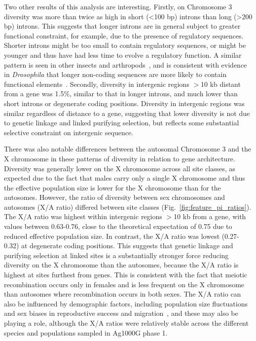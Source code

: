 \documentclass[a4paper,11pt,abstracton,hidelinks]{scrartcl}
\begin{document}
Two other results of this analysis are interesting.
%
Firstly, on Chromosome 3 diversity was more than twice as high in short (<100 bp) introns than long (>200 bp) introns.
%
This suggests that longer introns are in general subject to greater functional constraint, for example, due to the presence of regulatory sequences.
%
Shorter introns might be too small to contain regulatory sequences, or might be younger and thus have had less time to evolve a regulatory function.
%
A similar pattern is seen in other insects and arthropods~\parencite{Singh2013,Martin2016,Lynch2016}, and is consistent with evidence in
\textit{Drosophila} that longer non-coding sequences are more likely to contain functional elements~\parencite{Casillas2007}.
%
Secondly, diversity in intergenic regions $>$10 kb distant from a gene was 1.5\%, similar to that in longer introns, and much lower than short introns or degenerate coding positions.
%
Diversity in intergenic regions was similar regardless of distance to a gene, suggesting that lower diversity is not due to genetic linkage and linked purifying selection, but reflects some substantial selective constraint on intergenic sequence.


There was also notable differences between the autosomal Chromosome 3 and the X chromosome in these patterns of diversity in relation to gene architecture.
%
Diversity was generally lower on the X chromosome across all site classes, as expected due to the fact that males carry only a single X chromosome and thus the effective population size is lower for the X chromosome than for the autosomes.
%
However, the ratio of diversity between sex chromosomes and autosomes (X/A ratio) differed between site classes (Fig.~\ref{fig:feature_pi_ratios}).
%
The X/A ratio was highest within intergenic regions $>$10 kb from a gene, with values between 0.63-0.76, close to the theoretical expectation of 0.75 due to reduced effective population size.
%
In contrast, the X/A ratio was lowest (0.27-0.32) at degenerate coding positions.
%
This suggests that genetic linkage and purifying selection at linked sites is a substantially stronger force reducing diversity on the X chromosome than the autosomes, because the X/A ratio is highest at sites furthest from genes.
%
This is consistent with the fact that meiotic recombination occurs only in females and is less frequent on the X chromosome than autosomes where recombination occurs in both sexes.
%
The X/A ratio can also be influenced by demographic factors, including population size fluctuations and sex biases in reproductive success and migration~\parencite{CorbettDetig2015,Webster2016,Pool2007,Charlesworth2012b}, and these may also be playing a role, although the X/A ratios were relatively stable across the different species and populations sampled in Ag1000G phase 1.
%
\end{document}
